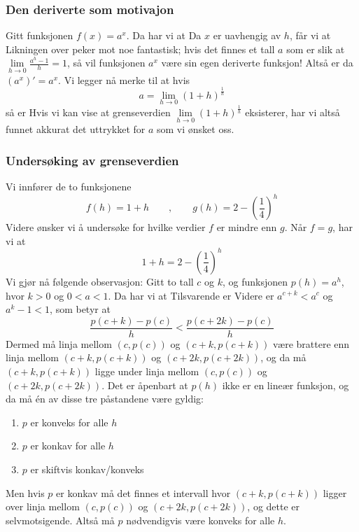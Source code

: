 



	
\subsubsection{Den deriverte som motivajon}
Gitt funksjonen $ f(x)=a^x $. Da har vi at
Da $ x $ er uavhengig av $ h $, får vi at
Likningen over peker mot noe fantastisk; hvis det finnes et tall $ a $ som er slik at $ {\lim\limits_{h\to 0}\frac{a^h-1}{h}=1} $, så vil funksjonen $ a^x $ være sin egen deriverte funksjon! Altså er da $ \left(a^x\right)'=a^x $. Vi legger nå merke til at hvis
\[ a=\lim\limits_{h\to 0}\left(1+h\right)^\frac{1}{h} \]
så er 
Hvis vi kan vise at grenseverdien $ \lim\limits_{h\to 0}\left(1+h\right)^\frac{1}{h} $ eksisterer, har vi altså funnet akkurat det uttrykket for $ a $ som vi ønsket oss.

\subsubsection{Undersøking av grenseverdien}
Vi innfører de to funksjonene
\[ f(h)=1+h \qquad,\qquad g(h)=2-\left(\frac{1}{4}\right)^{h}\]
Videre ønsker vi å undersøke for hvilke verdier $ f $ er mindre enn  $ g $. Når $ f=g $, har vi at
\begin{equation}\label{eforkleqh}
	1+h=2-\left(\frac{1}{4}\right)^h 
\end{equation}
Vi gjør nå følgende observasjon: Gitt to tall $ c $ og $ k $, og funksjonen $ p(h)=a^h $, hvor $ k>0 $ og $ 0<a<1 $. Da har vi at
Tilsvarende er
Videre er $ a^{c+k}<a^c $ og $ a^k-1<1 $, som betyr at
\[ \frac{p(c+k)-p(c)}{h}<\frac{p(c+2k)-p(c)}{h} \]
Dermed må linja mellom $ (c, p(c)) $ og $ (c+k, p(c+k)) $ være brattere enn linja mellom $ (c+k, p(c+k)) $ og $ (c+2k, p(c+2k)) $, og da må $ (c+k, p(c+k)) $ ligge under linja mellom $ (c, p(c)) $ og $ (c+2k, p(c+2k)) $.
Det er åpenbart at $ p(h) $ ikke er en lineær funksjon, og da må én av disse tre påstandene være gyldig:
\begin{enumerate}[label=(\alph*)]
	\item $ p $ er konveks for alle $ h$
	\item $ p $ er konkav for alle $ h $
	\item $ p $ er skiftvis konkav/konveks
\end{enumerate}
Men hvis $ p $ er konkav må det finnes et intervall hvor $ (c+k, p(c+k)) $ ligger over linja mellom $ (c, p(c)) $ og $ (c+2k, p(c+2k)) $, og dette er selvmotsigende. Altså må $ p $ nødvendigvis være konveks for alle $ h $.\vsk

